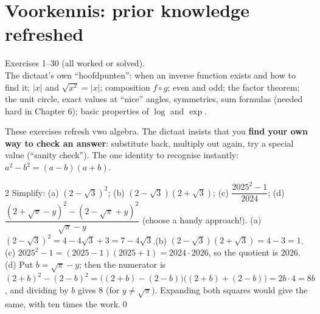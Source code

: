 \setcounter{chapter}{-1}
\chapter{Voorkennis: prior knowledge refreshed}
%
{Exercises 1--30 (all worked or solved).\\ The dictaat's own ``hoofdpunten'': when an inverse function exists and how to find it; $|x|$ and $\sqrt{x^2}=|x|$; composition $f\circ g$; even and odd; the factor theorem; the unit circle, exact values at ``nice'' angles, symmetries, sum formulas (needed hard in Chapter 6); basic properties of $\log$ and $\exp$.}


\begin{strategy}
These exercises refresh vwo algebra. The dictaat insists that you \textbf{find your own way to check an answer}: substitute back, multiply out again, try a special value (``sanity check''). The one identity to recognise instantly: $a^2-b^2=(a-b)(a+b)$.
\end{strategy}

\begin{bookex}{2}
Simplify: (a) $(2-\sqrt3)^2$; (b) $(2-\sqrt3)(2+\sqrt3)$; (c) $\dfrac{2025^2-1}{2024}$; (d) $\dfrac{(2+\sqrt\pi-y)^2-(2-\sqrt\pi+y)^2}{\sqrt\pi-y}$ (choose a handy approach!).
\solution
(a) $(2-\sqrt3)^2=4-4\sqrt3+3=7-4\sqrt3$.\quad (b) $(2-\sqrt3)(2+\sqrt3)=4-3=1$.\\
(c) $2025^2-1=(2025-1)(2025+1)=2024\cdot2026$, so the quotient is $2026$.\\
(d) Put $b=\sqrt\pi-y$; then the numerator is $(2+b)^2-(2-b)^2=\big((2+b)-(2-b)\big)\big((2+b)+(2-b)\big)=2b\cdot4=8b$, and dividing by $b$ gives $8$ (for $y\ne\sqrt\pi$). Expanding both squares would give the same, with ten times the work.\qed
\end{bookex}

